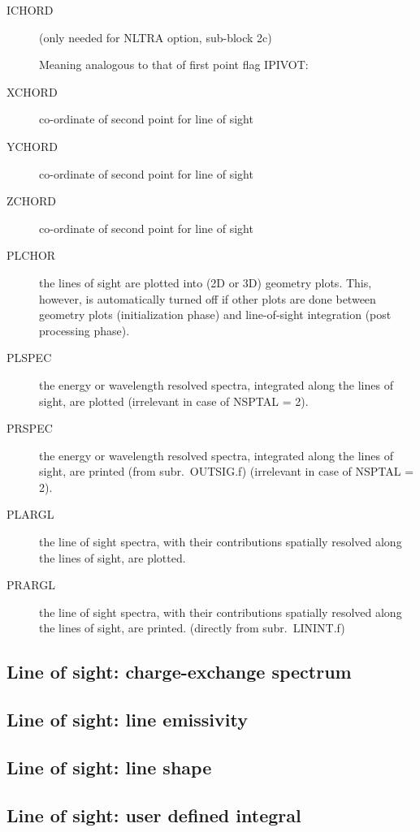 \begin{description}
  \item[ICHORD] (only needed for NLTRA option, sub-block 2c) 

        Meaning analogous to that of first point flag IPIVOT:

  \item[XCHORD]  co-ordinate of second point for line of sight
  \item[YCHORD]  co-ordinate of second point for line of sight
  \item[ZCHORD]  co-ordinate of second point for line of sight
  \item[PLCHOR] the lines of sight are plotted into (2D or 3D) geometry plots.
        This, however, is automatically turned off if other plots are done between
        geometry plots (initialization phase) and line-of-sight integration (post
        processing phase).
  \item[PLSPEC] the energy or wavelength resolved spectra, integrated along the
        lines of sight, are plotted (irrelevant in case of NSPTAL = 2).
  \item[PRSPEC] the energy or wavelength resolved spectra, integrated along the
        lines of sight, are printed (from subr.\ OUTSIG.f) (irrelevant in case of
        NSPTAL = 2).
  \item[PLARGL] the line of sight spectra, with their contributions spatially
        resolved along the lines of sight, are plotted.
  \item[PRARGL] the line of sight spectra, with their contributions spatially
        resolved along the lines of sight, are printed.
        (directly from subr.\ LININT.f)
\end{description}

\subsection{Line of sight: charge-exchange spectrum}
\label{sec2.12.1}

\subsection{Line of sight: line emissivity}\label{sec2.12.2}

\subsection{Line of sight: line shape}\label{sec2.12.3}

\subsection{Line of sight: user defined integral}\label{sec2.12.4}
